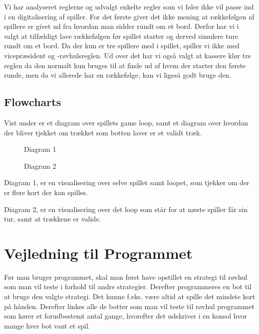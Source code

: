 \documentclass[a4paper, 12pt]{article}
\begin{document}
\begin{multicols}{2}
Vi har analyseret reglerne og udvalgt enkelte regler som vi føler ikke vil passe ind i en digitalisering af spiller. For det første giver det ikke mening at rækkefølgen af spillere er givet ud fra hvordan man sidder rundt om et bord. Derfor har vi i valgt at tilfældigt lave rækkefølgen før spillet starter og derved simulere ture rundt om et bord. Da der kun er tre spillere med i spillet, spiller vi ikke med vicepræsident og -røvhulsreglen.
Ud over det har vi også valgt at kassere klør tre reglen da den normalt kun bruges til at finde ud af hvem der starter den første runde, men da vi allerede har en rækkefølge, kan vi ligeså godt bruge den.

\vfill
\pagebreak

\subsection{Flowcharts}
Vist under er et diagram over spillets game loop, samt et diagram over hvordan der bliver tjekket om trækket som botten laver er et validt træk.
\begin{figure}[H]
    \centering
    \resizebox{.5\linewidth}{!}{}
    \caption{Diagram 1}
\end{figure}

\begin{figure}[H]
    \centering
    \resizebox{.5\linewidth}{!}{}
    \caption{Diagram 2}
\end{figure}

Diagram 1, er en visualisering over selve spillet samt loopet, som tjekker om der er flere kort der kan spilles.
\bigbreak

Diagram 2, er en visualisering over det loop som står for at næste spiller får sin tur, samt at trækkene er valide.

\vfill
\section{Vejledning til Programmet}

Før man bruger programmet, skal man først have opstillet en strategi til røvhul som man vil teste i forhold til andre strategier. Derefter programmeres en bot til at bruge den valgte strategi. Det kunne f.eks. være altid at spille det mindste kort på hånden. Derefter linkes alle de botter som man vil teste til røvhul programmet som kører et forudbestemt antal gange, hvorefter det udskriver i en konsol hvor mange hver bot vant et spil.


\end{multicols}
\end{document}
